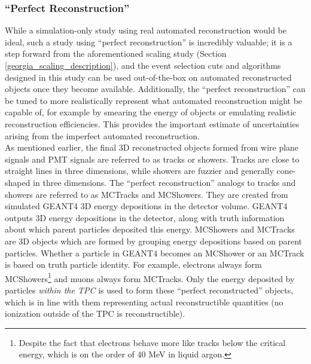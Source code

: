 \subsubsection{``Perfect Reconstruction''}\label{perfectreco_section}
While a simulation-only study using real automated reconstruction would be ideal, such a study using ``perfect reconstruction'' is incredibly valuable; it is a step forward from the aforementioned scaling study (Section \ref{georgia_scaling_description}), and the event selection cuts and algorithms designed in this study can be used out-of-the-box on automated reconstructed objects once they become available. Additionally, the ``perfect reconstruction'' can be tuned to more realistically represent what automated reconstruction might be capable of, for example by smearing the energy of objects or emulating realistic reconstruction efficiencies. This provides the important estimate of uncertainties arising from the imperfect automated reconstruction.\\

As mentioned earlier, the final 3D reconstructed objects formed from wire plane signals and PMT signals are referred to as tracks or showers. Tracks are close to straight lines in three dimensions, while showers are fuzzier and generally cone-shaped in three dimensions. The ``perfect reconstruction'' analogs to tracks and showers are referred to as {\sc MCTracks} and {\sc MCShowers}. They are created from simulated {\sc GEANT4} 3D energy depositions in the detector volume. {\sc GEANT4} outputs 3D energy depositions in the detector, along with truth information about which parent particles deposited this energy. {\sc MCShowers} and {\sc MCTracks} are 3D objects which are formed by grouping energy depositions based on parent particles. Whether a particle in {\sc GEANT4} becomes an {\sc MCShower} or an {\sc MCTrack} is based on truth particle identity. For example, electrons always form {\sc MCShower}s\footnote{Despite the fact that electrons behave more like tracks below the critical energy, which is on the order of 40 MeV in liquid argon.} and muons always form {\sc MCTrack}s. Only the energy deposited by particles \textit{within the TPC} is used to form these ``perfect reconstructed'' objects, which is in line with them representing actual reconstructible quantities (no ionization outside of the TPC is reconstructible).\\

